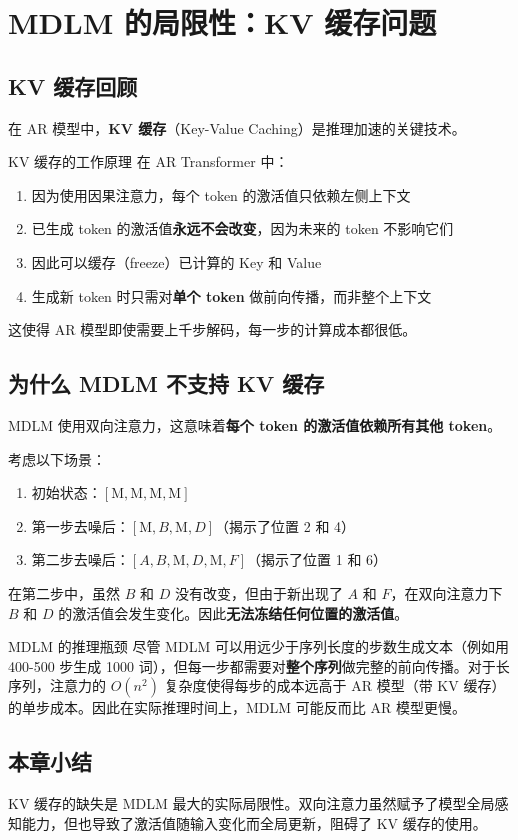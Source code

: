 \section{MDLM 的局限性：KV 缓存问题}

\subsection{KV 缓存回顾}

在 AR 模型中，\textbf{KV 缓存}（Key-Value Caching）是推理加速的关键技术。

\begin{knowledgebox}{KV 缓存的工作原理}
在 AR Transformer 中：
\begin{enumerate}
    \item 因为使用因果注意力，每个 token 的激活值只依赖左侧上下文
    \item 已生成 token 的激活值\textbf{永远不会改变}，因为未来的 token 不影响它们
    \item 因此可以缓存（freeze）已计算的 Key 和 Value
    \item 生成新 token 时只需对\textbf{单个 token} 做前向传播，而非整个上下文
\end{enumerate}
这使得 AR 模型即使需要上千步解码，每一步的计算成本都很低。
\end{knowledgebox}

\subsection{为什么 MDLM 不支持 KV 缓存}

MDLM 使用双向注意力，这意味着\textbf{每个 token 的激活值依赖所有其他 token}。

考虑以下场景：
\begin{enumerate}
    \item 初始状态：$[\text{M}, \text{M}, \text{M}, \text{M}]$
    \item 第一步去噪后：$[\text{M}, B, \text{M}, D]$（揭示了位置 2 和 4）
    \item 第二步去噪后：$[A, B, \text{M}, D, \text{M}, F]$（揭示了位置 1 和 6）
\end{enumerate}

在第二步中，虽然 $B$ 和 $D$ 没有改变，但由于新出现了 $A$ 和 $F$，在双向注意力下 $B$ 和 $D$ 的激活值会发生变化。因此\textbf{无法冻结任何位置的激活值}。

\begin{warningbox}{MDLM 的推理瓶颈}
尽管 MDLM 可以用远少于序列长度的步数生成文本（例如用 400-500 步生成 1000 词），但每一步都需要对\textbf{整个序列}做完整的前向传播。对于长序列，注意力的 $O(n^2)$ 复杂度使得每步的成本远高于 AR 模型（带 KV 缓存）的单步成本。因此在实际推理时间上，MDLM 可能反而比 AR 模型更慢。
\end{warningbox}

\subsection{本章小结}

KV 缓存的缺失是 MDLM 最大的实际局限性。双向注意力虽然赋予了模型全局感知能力，但也导致了激活值随输入变化而全局更新，阻碍了 KV 缓存的使用。

\newpage
